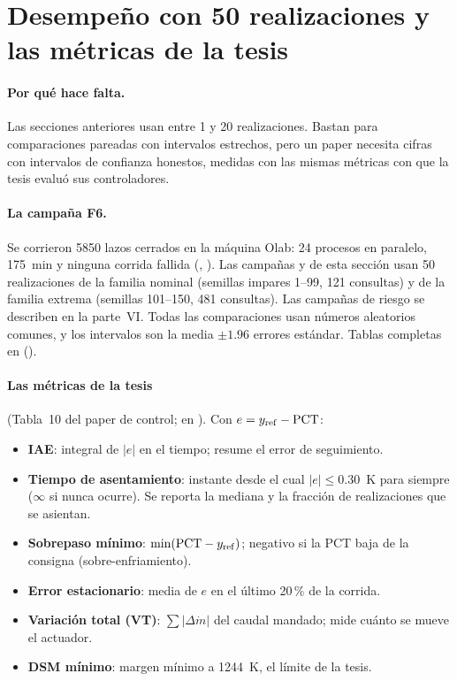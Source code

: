 \section{Desempeño con 50 realizaciones y las métricas de la tesis}\label{sec:desempeno}
\paragraph{Por qué hace falta.} Las secciones anteriores usan entre 1 y 20 realizaciones. Bastan
para comparaciones pareadas con intervalos estrechos, pero un paper necesita cifras con
intervalos de confianza honestos, medidas con las mismas métricas con que la tesis evaluó sus
controladores.

\paragraph{La campaña F6.} Se corrieron 5850 lazos cerrados en la máquina Olab: 24 procesos
en paralelo, 175~min y ninguna corrida fallida (,
). Las campañas  y  de esta sección usan 50
realizaciones de la familia nominal (semillas impares 1--99, 121 consultas) y de la familia
extrema (semillas 101--150, 481 consultas). Las campañas de riesgo se describen en la
parte~VI. Todas las comparaciones usan números aleatorios comunes, y los intervalos son la
media $\pm1.96$ errores estándar. Tablas completas en 
().

\paragraph{Las métricas de la tesis} (Tabla~10 del paper de control;  en
). Con $e=y_{\rm ref}-\mathrm{PCT}$:
\begin{itemize}
  \item \textbf{IAE}: integral de $|e|$ en el tiempo; resume el error de seguimiento.
  \item \textbf{Tiempo de asentamiento}: instante desde el cual $|e|\le0.30$~K para siempre
        ($\infty$ si nunca ocurre). Se reporta la mediana y la fracción de realizaciones que
        se asientan.
  \item \textbf{Sobrepaso mínimo}: $\min(\mathrm{PCT}-y_{\rm ref})$; negativo si la PCT baja
        de la consigna (sobre-enfriamiento).
  \item \textbf{Error estacionario}: media de $e$ en el último 20\,\% de la corrida.
  \item \textbf{Variación total (VT)}: $\sum|\Delta\dot m|$ del caudal mandado; mide cuánto se
        mueve el actuador.
  \item \textbf{DSM mínimo}: margen mínimo a 1244~K, el límite de la tesis.
\end{itemize}

